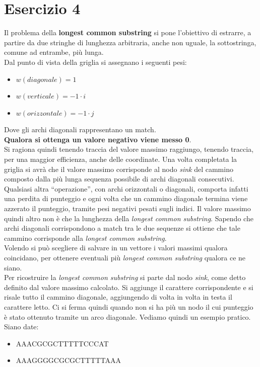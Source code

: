 \documentclass[a4paper,12pt, oneside]{book}
\begin{document}
\chapter{Esercizio 4}
Il problema della \textbf{longest common substring} si pone l'obiettivo di
estrarre, a partire da due stringhe di lunghezza arbitraria, anche non uguale,
la sottostringa, comune ad entrambe, più lunga.\\
Dal punto di vista della griglia si assegnano i seguenti pesi:
\begin{itemize}
  \item $w(diagonale)=1$
  \item $w(verticale)=-1\cdot i$
  \item $w(orizzontale)=-1\cdot j$
\end{itemize}
Dove gli archi diagonali rappresentano un match.\\
\textbf{Qualora si ottenga un valore negativo viene messo 0}.\\
Si ragiona quindi tenendo traccia del valore massimo raggiungo, tenendo traccia,
per una maggior efficienza, anche delle coordinate. Una volta completata la
griglia si avrà che il valore massimo corrisponde al nodo \textit{sink} del
cammino composto dalla più lunga sequenza possibile di archi diagonali
consecutivi. Qualsiasi altra ``operazione'', con archi orizzontali o diagonali,
comporta infatti una perdita di punteggio e ogni volta che un cammino diagonale
termina viene azzerato il punteggio, tramite pesi negativi pesati sugli
indici. Il valore massimo quindi altro non è che 
la lunghezza della \textit{longest common substring}. Sapendo che archi
diagonali corrispondono a match tra le due sequenze si ottiene che tale cammino
corrisponde alla \textit{longest common substring}. \\
Volendo si può scegliere di salvare in un vettore i valori massimi qualora
coincidano, per ottenere eventuali più \textit{longest common substring} qualora
ce ne siano.\\
Per ricostruire la \textit{longest common substring} si parte dal nodo
\textit{sink}, come detto definito dal valore massimo calcolato. Si aggiunge il
carattere corrispondente e si risale tutto il cammino diagonale, aggiungendo di
volta in volta in testa il carattere letto. Ci si ferma quindi quando non si ha
più un nodo il cui punteggio è stato ottenuto tramite un arco diagonale.
\newpage
Vediamo quindi un esempio pratico. Siano date:
\begin{itemize}
  \item AAACGCGCTTTTTCCCAT
  \item AAAGGGGCGCGCTTTTTAAA
\end{itemize}
\end{document}
